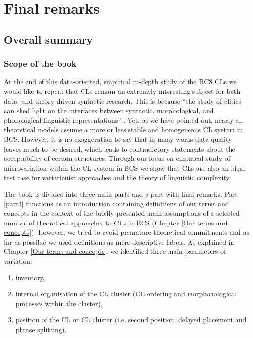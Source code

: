 \part{Final remarks}
\label{part4}
\chapter{Overall summary}
\label{Summary and outlook}



\section{Scope of the book}

At the end of this data-oriented, empirical in-depth study of the BCS CLs we would like to repeat that CLs remain an extremely interesting subject for both data- and theory-driven syntactic research. This is because ``the study of clitics can shed light on the interfaces between syntactic, morphological, and phonological linguistic representations'' \citep[12]{FJL04}. Yet, as we have pointed out, nearly all theoretical models assume a more or less stable and homogeneous CL system in BCS. However, it is no exaggeration to say that in many works data quality leaves much to be desired, which leads to contradictory statements about the acceptability of certain structures. Through our focus on empirical study of microvariation within the CL system in BCS we show that CLs are also an ideal test case for variationist approaches and the theory of linguistic complexity. 



The book is divided into three main parts and a part with final remarks. Part \ref{part1} functions as an introduction containing definitions of our terms and concepts in the context of the briefly presented main assumptions of a selected number of theoretical approaches to CLs in BCS (Chapter \ref{Our terms and concepts}). However, we tried to avoid premature theoretical commitments and as far as possible we used definitions as mere descriptive labels. As explained in Chapter \ref{Our terms and concepts}, we identified three main parameters of variation:
\begin{enumerate}
	 \item inventory, 
	\item internal organisation of the CL cluster (CL ordering and morphonological processes within the cluster),
	\item position of the CL or CL cluster (i.e. second position, delayed placement and phrase splitting). 
\end{enumerate}


